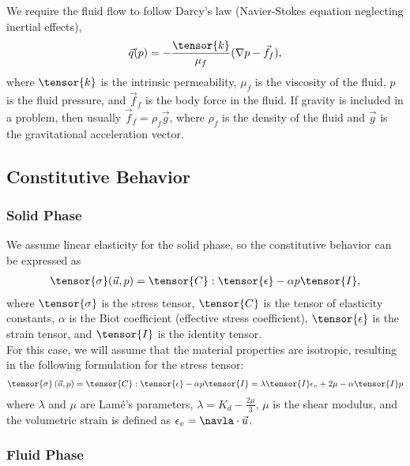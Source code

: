 We require the fluid flow to follow Darcy's law (Navier-Stokes equation neglecting inertial
effects),
\begin{gather}
  \vec{q}(p) = -\frac{\tensor{k}}{\mu_{f}}(\nabla p - \vec{f}_f), \\
\end{gather}
where $\tensor{k}$ is the intrinsic permeability, $\mu_f$ is the viscosity of the
fluid, $p$ is the fluid pressure, and $\vec{f}_f$ is the body force
in the fluid. If gravity is included in a problem, then usually
$\vec{f}_f = \rho_f \vec{g}$, where $\rho_f$ is the density of the
fluid and $\vec{g}$ is the gravitational acceleration vector.\\

\subsection{Constitutive Behavior}

\subsubsection{Solid Phase}

We assume linear elasticity for the solid phase, so the constitutive behavior can be expressed
as
\begin{gather}
  \tensor{\sigma}(\vec{u},p) = \tensor{C} : \tensor{\epsilon} - \alpha p \tensor{I},
\end{gather}
where $\tensor{\sigma}$ is the stress tensor, $\tensor{C}$ is the
tensor of elasticity constants, $\alpha$ is the Biot coefficient
(effective stress coefficient), $\tensor{\epsilon}$ is the strain
tensor, and $\tensor{I}$ is the identity tensor.\\
For this case, we will assume that the material properties are isotropic, resulting
in the following formulation for the stress tensor:
\begin{align}
    \tensor{\sigma}\left(\vec{u},p \right) = \tensor{C}:\tensor{\epsilon} - \alpha p \tensor{I}
                                           = \lambda \tensor{I} \epsilon_{v} + 2 \mu - \alpha \tensor{I} p
\end{align}
where $\lambda$ and $\mu$ are Lam\'e's parameters, $\lambda = K_{d} - \frac{2 \mu}{3}$, $\mu$ is the shear modulus,
and the volumetric strain is defined as  $\epsilon_{v} = \navla \cdot \vec{u}$.

\subsubsection{Fluid Phase}

